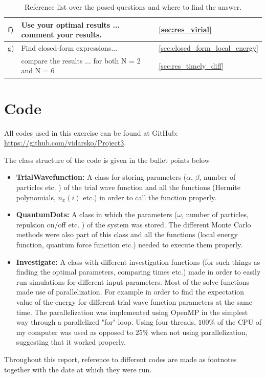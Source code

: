\documentclass[a4paper,10pt,english]{article}
\numberwithin{figure}{subsection}
\numberwithin{table}{subsection}
\numberwithin{equation}{subsection}
\begin{document}
\begin{appendices}
\begin{table}[h!]
\begin{tabular}{lll}
        \midrule 
        f) & Use your optimal results ... comment your results. & \ref{sec:res_virial}\\
        \midrule
        g) &  Find closed-form expressions... & \ref{sec:closed_form_local_energy} \\
           & compare the results ... for both N = 2 and N = 6 & \ref{sec:res_timely_diff} \\
        \bottomrule
        \end{tabular}
        \caption{Reference list over the posed questions and where to find the answer.}
\end{table}



\clearpage


\section{Code} \label{sec:codes}
All codes used in this exercise can be found at GitHub: \newline
\url{https://github.com/vidarsko/Project3}. 

The class structure of the code is given in the bullet points below

\begin{itemize}
    \item \textbf{TrialWavefunction:} A class for storing parameters ($\alpha$, $\beta$, number of particles etc. ) of the trial wave function and all the functions (Hermite polynomials, $n_x(i)$ etc.) in order to call the function properly.
    \item \textbf{QuantumDots:} A class in which the parameters ($\omega$, number of particles, repulsion on/off etc. ) of the system was stored. The different Monte Carlo methods were also part of this class and all the functions (local energy function, quantum force function etc.) needed to execute them properly. 
    \item \textbf{Investigate:} A class with different investigation functions (for such things as finding the optimal parameters, comparing times etc.) made in order to easily run simulations for different input parameters. Most of the solve functions made use of parallelization. For example in order to find the expectation value of the energy for different trial wave function parameters at the same time. 
    The parallelization was implemented using OpenMP in the simplest way through a parallelized "for"-loop. Using four threads, $100 \%$ of the CPU of my computer was used as opposed to $25\%$ when not using parallelization, suggesting that it worked properly.
\end{itemize}

Throughout this report, reference to different codes are made as footnotes together with the date at which they were run. 

\end{appendices}
\end{document}
